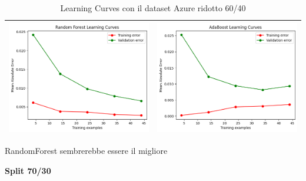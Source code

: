 \begin{table}[H]
\begin{tabularx}{\textwidth}{|X|X|}
        \includegraphics[width=\linewidth, trim=0 0 0 0]{images/RandomForest_lc60_ridottoAzure.png} &
        \includegraphics[width=\linewidth, trim=0 0 0 0]{images/AdaBoost_lc60_ridottoAzure.png} \\
        \hline
    \end{tabularx}
    \caption{Learning Curves con il dataset Azure ridotto 60/40}
    \label{tab:emissions_info}
\end{table}

\noindent RandomForest sembrerebbe essere il migliore


\noindent\textbf{Split 70/30}


